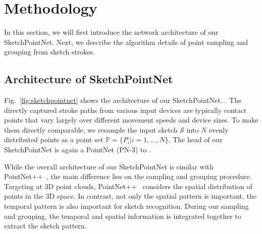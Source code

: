 \section{Methodology}
\label{sec:methodology}


In this section, we will first introduce the network architecture of our SketchPointNet. Next, we describe the algorithm details of point sampling and grouping from sketch strokes. 


\subsection{Architecture of SketchPointNet}
\label{ssec:sketch_point_net}

Fig.~\ref{fig:sketchpointnet} shows the architecture of our SketchPointNet.
%
.
The directly captured stroke paths from various input devices are typically contact points that vary largely over different movement speeds and device sizes. 
To make them directly comparable, we resample the input sketch $\mathcal{S}$ into $N$ evenly distributed points as a point set $\mathbb{P}=\{P_i|i=1,\ldots,N\}$.  
%
%
%
The head of our SketchPointNet is again a PointNet (PN-3) to .   

 

While the overall architecture of our SketchPointNet is similar with PointNet++~\cite{qi2017pointnetplusplus}, the main difference lies on the sampling and grouping procedure.
Targeting at 3D point clouds, PointNet++~\cite{qi2017pointnetplusplus} considers the spatial distribution of points in the 3D space.
In contrast, not only the spatial pattern is important, the temporal pattern is also important for sketch recognition. 
%
During our sampling and grouping, the temporal and spatial information is integrated together to extract the sketch pattern. 

